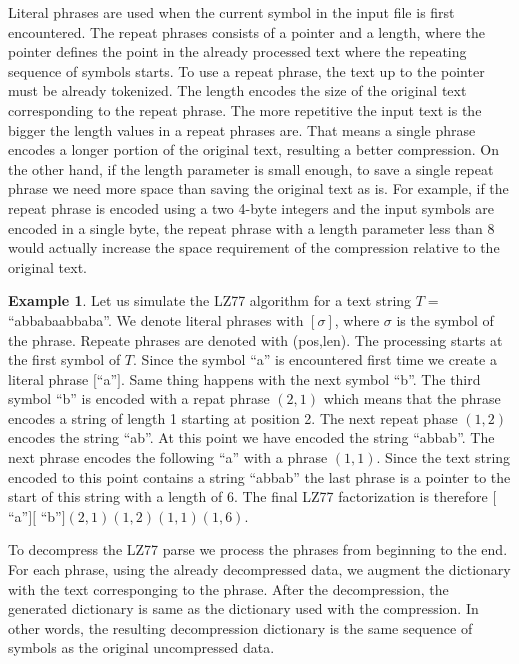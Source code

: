 \documentclass[english,twoside,censored,csm,algorithms-track-2020]{HYthesisML}
\theoremstyle{plain}
\theoremstyle{definition}
\newtheorem{example}[theorem]{Example}
\begin{document}
Literal phrases are used when the current symbol in the input file is first encountered. The repeat
phrases consists of a pointer and a length, where the pointer defines the point in the already
processed text where the repeating sequence of symbols starts. To use a repeat phrase, the text up
to the pointer must be already tokenized.
The length encodes the size of the original text
corresponding to the repeat phrase. The more repetitive the input text is the bigger the length
values in a repeat phrases are. That means a single phrase encodes a longer portion of the original
text, resulting a better compression. On the other hand, if the length parameter is small enough,
to save a single repeat phrase we need more space than saving the original text as is. For example,
if the repeat phrase is encoded using a two 4-byte integers and the input symbols are encoded in a
single byte, the repeat phrase with a length parameter less than 8 would actually increase the
space requirement of the compression relative to the original text.

\begin{example}
  Let us simulate the LZ77 algorithm for a text string $T=$ ``abbabaabbaba''. We denote literal phrases
  with $[\sigma]$, where $\sigma$ is the symbol of the phrase. Repeate phrases are denoted
  with (pos,len). The processing starts
  at the first symbol of $T$. Since the symbol ``a'' is encountered first time we create a
  literal phrase $[$``a''$]$. Same thing happens with the next symbol ``b''. The third symbol ``b'' is
  encoded with a repat phrase $(2,1)$ which means that the phrase encodes a string of length 1 starting
  at position 2. The next repeat phase $(1,2)$ encodes the string ``ab''. At this point we have encoded
  the string ``abbab''. The next phrase encodes the following ``a'' with a phrase $(1,1)$. Since
  the text string encoded to this point contains a string ``abbab'' the last phrase is a pointer
  to the start of this string with a length of 6. The final LZ77 factorization is therefore
  $[$ ``a''$][$ ``b''$](2,1)(1,2)(1,1)(1,6)$.
\end{example}

To decompress the LZ77 parse we process the phrases from beginning to the end. For each
phrase, using the already decompressed data, we augment the dictionary with the text corresponging
to the phrase. After the decompression, the generated dictionary is same as the dictionary used with the
compression. In other words, the resulting decompression dictionary is the same sequence of symbols
as the original uncompressed data. 
\end{document}
